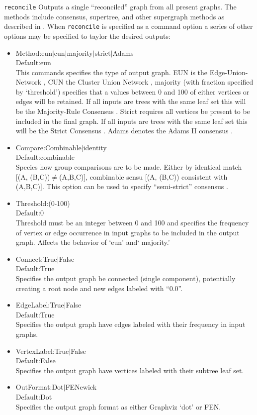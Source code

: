 \documentclass[11pt]{article}
\begin{document}
				\smallskip
				\noindent \texttt{reconcile} Outputs  a single ``reconciled'' graph from all present graphs.  The methods include consensus, supertree, and other supergraph methods as described in \cite{Wheeler2012, Wheeler2021a}.  When \texttt{reconcile} is specified as a command option a series of  other options may be specified to taylor the desired outputs:
					\begin{itemize}
							\item {Method:eun$\mid$cun$\mid$majority$\mid$strict$\mid$Adams\\Default:eun\\This commands specifies the type of output graph.
							EUN is the Edge-Union-Network \citep{MiyagiandWheeler2019}, CUN the Cluster Union Network \citep{Baroni2005},
							majority (with fraction specified by `threshold') specifies that a values between 0 and 100 of either vertices or edges will be retained.  If all inputs are trees with the same leaf set this will be the Majority-Rule Consensus \citep{MargushandMcMorris1981}.
							Strict requires all vertices be present to be included in the final graph.  If all inputs are trees with the same leaf set this will be the Strict Consensus \citep{Schuhandpolhemus1980}. Adams denotes the Adams II consensus \citep{Adams1972}.}
						\item{Compare:Combinable$\mid$identity\\Default:combinable\\Species how group comparisons are to be made.  Either by identical match [(A, (B,C))$\neq$(A,B,C)],
							combinable sensu \cite{Nelson1979} [(A, (B,C)) consistent with (A,B,C)].  This option can be used to specify ``semi-strict'' consensus
							\citep{Bremer1990}.
						}
						\item{Threshold:(0-100)\\Default:0\\Threshold must be an integer between 0 and 100 and specifies the frequency of vertex or edge occurrence in input graphs to be included in the output graph.  Affects the behavior of `eun' and` majority.'
						}
						\item{Connect:True$\mid$False\\Default:True\\Specifies the output graph be connected (single component), potentially creating a root node and new edges labeled with ``0.0''.
						}
						\item{EdgeLabel:True$\mid$False\\Default:True\\Specifies the output graph have edges labeled with their frequency in input graphs.
						}
						\item{VertexLabel:True$\mid$False\\Default:False\\Specifies the output graph have vertices labeled with their subtree leaf set.
						}
						\item{OutFormat:Dot$\mid$FENewick\\Default:Dot\\Specifies the output graph format as either Graphviz `dot' or FEN.
						}
					\end{itemize}				 
				
\end{document}
